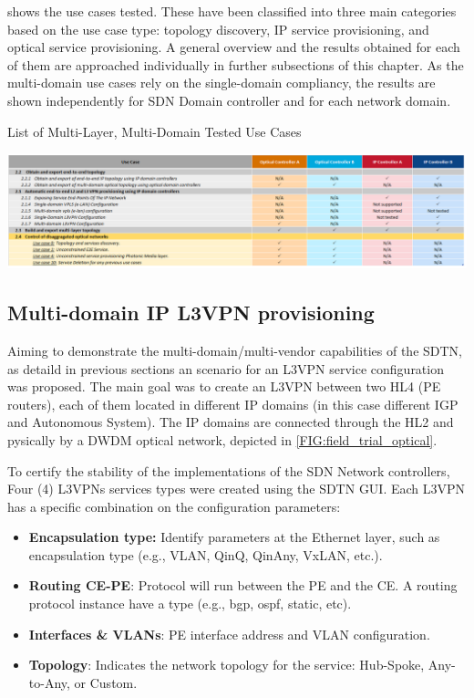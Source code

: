 \documentclass[a4paper,fleqn]{cas-dc}
\begin{document}
 shows the use cases tested. These have been classified into three main categories based on the use case type: topology discovery, IP service provisioning, and optical service provisioning. A general overview and the results obtained for each of them are approached individually in further subsections of this chapter. As the multi-domain use cases rely on the single-domain compliancy, the results are shown independently for SDN Domain controller and for each network domain.

\begin{table}
	\caption{List of Multi-Layer, Multi-Domain Tested Use Cases}
	\centering
		\includegraphics[scale=0.5]{figs/tested_use_cases.png}
	\label{TAB:tested_use_cases}
\end{table}

\subsection{Multi-domain IP L3VPN provisioning}

Aiming to demonstrate the multi-domain/multi-vendor capabilities of the SDTN, as detaild in previous sections an scenario for an L3VPN service configuration was proposed. The main goal was to create an L3VPN between two HL4 (PE routers), each of them located in different IP domains (in this case different IGP and Autonomous System). The IP domains are connected through the HL2 and pysically by a DWDM optical network, depicted in \cref{FIG:field_trial_optical}. 

To certify the stability of the implementations of the SDN Network controllers, Four (4) L3VPNs services types were created using the SDTN GUI. Each L3VPN has a specific combination on the configuration parameters:

\begin{itemize}
    \item \textbf{Encapsulation type:} Identify parameters at the Ethernet layer, such as encapsulation type (e.g., VLAN, QinQ, QinAny, VxLAN, etc.).
    \item \textbf{Routing CE-PE}: Protocol will run between the PE and the CE. A routing protocol instance have a type (e.g., bgp, ospf, static, etc).
    \item \textbf{Interfaces \& VLANs}: PE interface address and VLAN configuration.
    \item \textbf{Topology}: Indicates the network topology for the service: Hub-Spoke, Any-to-Any, or Custom. 
\end{itemize}
\end{document}
